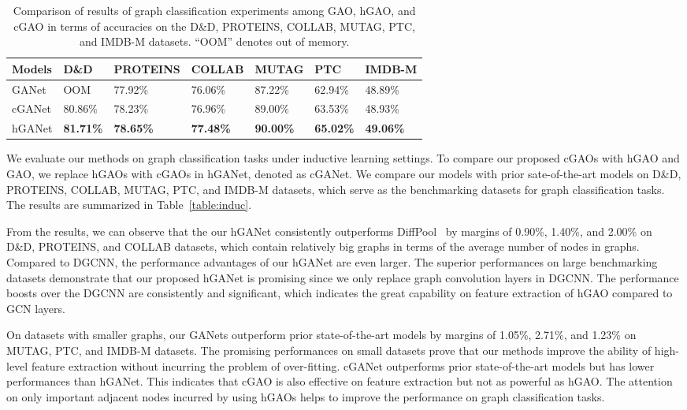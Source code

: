 \documentclass[sigconf]{acmart}
\begin{document}
\begin{table*}[t]
\caption{
Comparison of results of graph classification experiments among GAO, hGAO, and cGAO
in terms of accuracies on the
D\&D, PROTEINS, COLLAB, MUTAG, PTC, and IMDB-M datasets. ``OOM'' denotes out of memory.}
\label{table:gats}
\begin{tabularx}{\textwidth}{  XYYYYYY  }
    \hline
    \textbf{Models} & \textbf{D\&D} & \textbf{PROTEINS} & \textbf{COLLAB} & \textbf{MUTAG} & \textbf{PTC} & \textbf{IMDB-M} \\ \hline\hline
    GANet       & OOM & 77.92\%  & 76.06\%  & 87.22\%  & 62.94\% & 48.89\%  \\ \hline
    cGANet      & 80.86\% & 78.23\%  & 76.96\%  & 89.00\%  & 63.53\% & 48.93\% \\ \hline
    hGANet      & \textbf{81.71\%} & \textbf{78.65\%}  & \textbf{77.48\%}  & \textbf{90.00\%}
                & \textbf{65.02\%} & \textbf{49.06\%} \\ \hline
    \hline
\end{tabularx}
\end{table*}

We evaluate our methods on graph classification tasks under inductive learning
settings. To compare our proposed cGAOs with hGAO and GAO, we replace hGAOs
with cGAOs in hGANet, denoted as cGANet. We compare our models with prior
sate-of-the-art models on D\&D, PROTEINS, COLLAB, MUTAG, PTC, and IMDB-M
datasets, which serve as the benchmarking datasets for graph classification
tasks. The results are summarized in Table~\ref{table:induc}.

From the results, we can observe that the our hGANet consistently outperforms
DiffPool~\cite{ying2018hierarchical} by margins of 0.90\%, 1.40\%, and 2.00\%
on D\&D, PROTEINS, and COLLAB datasets, which contain relatively big graphs in
terms of the average number of nodes in graphs. Compared to DGCNN, the
performance advantages of our hGANet are even larger. The superior
performances on large benchmarking datasets demonstrate that our proposed
hGANet is promising since we only replace graph convolution layers in DGCNN.
The performance boosts over the DGCNN are consistently and significant, which
indicates the great capability on feature extraction of hGAO compared to GCN
layers.

On datasets with smaller graphs, our GANets outperform prior state-of-the-art
models by margins of 1.05\%, 2.71\%, and 1.23\% on MUTAG, PTC, and IMDB-M
datasets. The promising performances on small datasets prove that our methods
improve the ability of high-level feature extraction without incurring the
problem of over-fitting. cGANet outperforms prior state-of-the-art models but
has lower performances than hGANet. This indicates that cGAO is also effective
on feature extraction but not as powerful as hGAO. The attention on only
important adjacent nodes incurred by using hGAOs helps to improve the
performance on graph classification tasks.
\end{document}

